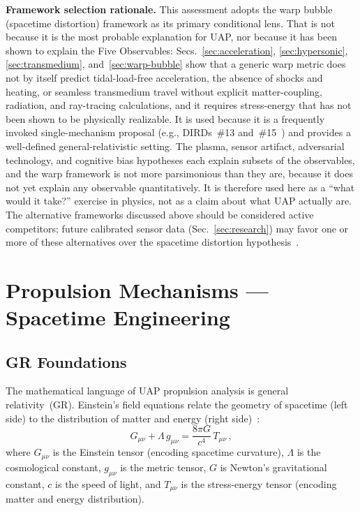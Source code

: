 \documentclass[aps,prd,twocolumn,superscriptaddress,nofootinbib,floatfix]{revtex4-2}
\begin{document}
\textbf{Framework selection rationale.} This assessment adopts the warp bubble
(spacetime distortion) framework as its primary conditional lens. That is not
because it is the most probable explanation for UAP, nor because it has been shown
to explain the Five Observables: Secs.~\ref{sec:acceleration},
\ref{sec:hypersonic}, \ref{sec:transmedium}, and~\ref{sec:warp-bubble} show that a
generic warp metric does not by itself predict tidal-load-free acceleration, the
absence of shocks and heating, or seamless transmedium travel without explicit
matter-coupling, radiation, and ray-tracing calculations, and it requires
stress-energy that has not been shown to be physically realizable. It is used
because it is a frequently invoked single-mechanism proposal (e.g., DIRDs~\#13
and~\#15~\cite{DIRD_ObousyDavis,DIRD_Puthoff}) and provides a well-defined
general-relativistic setting. The plasma, sensor artifact, adversarial technology,
and cognitive bias hypotheses each explain subsets of the observables, and the
warp framework is not more parsimonious than they are, because it does not yet
explain any observable quantitatively. It is therefore used here as a ``what would
it take?'' exercise in physics, not as a claim about what UAP actually are. The
alternative frameworks discussed above should be considered active competitors;
future calibrated sensor data (Sec.~\ref{sec:research}) may favor one or more of
these alternatives over the spacetime distortion
hypothesis~\cite{Alcubierre1994,BirrellDavies1982,NASA_UAP2023,Condign2000,AARO_Parallax2024}.

\section{Propulsion Mechanisms --- Spacetime Engineering}\label{sec:propulsion}

\subsection{GR Foundations}\label{sec:gr-foundations}

The mathematical language of UAP propulsion analysis is general
relativity~(GR). Einstein's field equations relate the geometry of spacetime
(left side) to the distribution of matter and energy (right
side)~\cite{MTW1973,Wald1984}:
\begin{equation}\label{eq:einstein}
  G_{\mu\nu} + \Lambda\,g_{\mu\nu}
  = \frac{8\pi G}{c^{4}}\,T_{\mu\nu}\,,
\end{equation}
where $G_{\mu\nu}$ is the Einstein tensor (encoding spacetime curvature),
$\Lambda$ is the cosmological constant, $g_{\mu\nu}$ is the metric tensor, $G$ is
Newton's gravitational constant, $c$ is the speed of light, and $T_{\mu\nu}$ is
the stress-energy tensor (encoding matter and energy distribution).
\end{document}
